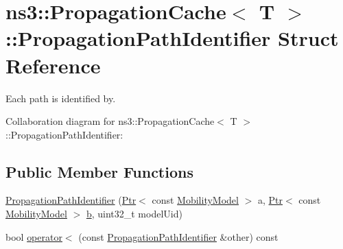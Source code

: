 \hypertarget{structns3_1_1PropagationCache_1_1PropagationPathIdentifier}{}\section{ns3\+:\+:Propagation\+Cache$<$ T $>$\+:\+:Propagation\+Path\+Identifier Struct Reference}
\label{structns3_1_1PropagationCache_1_1PropagationPathIdentifier}


Each path is identified by.  




Collaboration diagram for ns3\+:\+:Propagation\+Cache$<$ T $>$\+:\+:Propagation\+Path\+Identifier\+:
\subsection*{Public Member Functions}
\begin{DoxyCompactItemize}
\item 
\hyperlink{structns3_1_1PropagationCache_1_1PropagationPathIdentifier_a0c7947ea5bea2a342bf603c53e7c51c4}{Propagation\+Path\+Identifier} (\hyperlink{classns3_1_1Ptr}{Ptr}$<$ const \hyperlink{classns3_1_1MobilityModel}{Mobility\+Model} $>$ a, \hyperlink{classns3_1_1Ptr}{Ptr}$<$ const \hyperlink{classns3_1_1MobilityModel}{Mobility\+Model} $>$ \hyperlink{lte__pathloss_8m_a21ad0bd836b90d08f4cf640b4c298e7c}{b}, uint32\+\_\+t model\+Uid)
\item 
bool \hyperlink{structns3_1_1PropagationCache_1_1PropagationPathIdentifier_a06acdf6adee2b0e450b41971640ef8d5}{operator$<$} (const \hyperlink{structns3_1_1PropagationCache_1_1PropagationPathIdentifier}{Propagation\+Path\+Identifier} \&other) const 
\end{DoxyCompactItemize}
